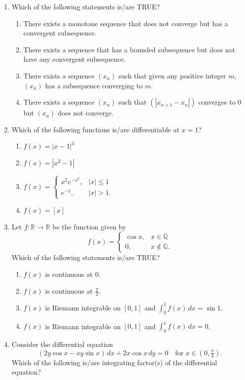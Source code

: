\begin{enumerate}
\item Which of the following statements is/are TRUE?
\begin{enumerate}[label=(\Alph*)]
\item There exists a monotone sequence that does not converge but has a convergent subsequence.
\item There exists a sequence that has a bounded subsequence but does not have any convergent subsequence.
\item There exists a sequence $(x_n)$ such that given any positive integer $m$, $(x_n)$ has a subsequence converging to $m$.
\item There exists a sequence $(x_n)$ such that $(|x_{n+1}-x_n|)$ converges to $0$ but $(x_n)$ does not converge.
\end{enumerate}
\item Which of the following functions is/are differentiable at $x=1$?
\begin{enumerate}[label=(\Alph*)]
\item $f(x)=|x-1|^3$
\item $f(x)=|x^2-1|$
\item $f(x)=\begin{cases}x^2e^{-x^2},&|x|\le1\\e^{-1},&|x|>1.\end{cases}$
\item $f(x)=[x]$
\end{enumerate}
\item Let $f:\mathbb R\to\mathbb R$ be the function given by
\[f(x)=\begin{cases}\cos x,&x\in\mathbb Q\\0,&x\notin\mathbb Q.\end{cases}\]
Which of the following statements is/are TRUE?
\begin{enumerate}[label=(\Alph*)]
\item $f(x)$ is continuous at $0$.
\item $f(x)$ is continuous at $\frac\pi2$.
\item $f(x)$ is Riemann integrable on $[0,1]$ and $\int_0^1 f(x)\,dx=\sin1$.
\item $f(x)$ is Riemann integrable on $[0,1]$ and $\int_0^1 f(x)\,dx=0$.
\end{enumerate}
\item Consider the differential equation
\[(2y\cos x-xy\sin x)\,dx+2x\cos x\,dy=0\quad\text{for }x\in(0,\tfrac\pi4).\]
Which of the following is/are integrating factor(s) of the differential equation?
\begin{enumerate}[label=(\Alph*)]

\end{enumerate}
\end{enumerate}
